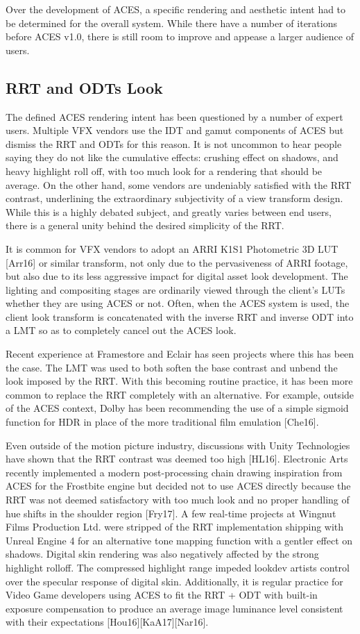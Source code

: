 \documentclass[conference]{IEEEtran}
\begin{document}
Over the development of ACES, a specific rendering and aesthetic intent had to be determined for the overall system. While there have a number of iterations before ACES v1.0, there is still room to improve and appease a larger audience of users.

\subsection{RRT and ODTs Look}
The defined ACES rendering intent has been questioned by a number of expert users. Multiple VFX vendors use the IDT and gamut components of ACES but dismiss the RRT and ODTs for this reason. It is not uncommon to hear people saying they do not like the cumulative effects: crushing effect on shadows, and heavy highlight roll off, with too much look for a rendering that should be average. On the other hand, some vendors are undeniably satisfied with the RRT contrast, underlining the extraordinary subjectivity of a view transform design. While this is a highly debated subject, and greatly varies between end users, there is a general unity behind the desired simplicity of the RRT.

It is common for VFX vendors to adopt an ARRI K1S1 Photometric 3D LUT [Arr16] or similar transform, not only due to the pervasiveness of ARRI footage, but also due to its less aggressive impact for digital asset look development. The lighting and compositing stages are ordinarily viewed through the client's LUTs whether they are using ACES or not. Often, when the ACES system is used, the client look transform is concatenated with the inverse RRT and inverse ODT into a LMT so as to completely cancel out the ACES look.

Recent experience at Framestore and Eclair has seen projects where this has been the case. The LMT was used to both soften the base contrast and unbend the look imposed by the RRT. With this becoming routine practice, it has been more common to replace the RRT completely with an alternative. For example, outside of the ACES context, Dolby has been recommending the use of a simple sigmoid function for HDR in place of the more traditional film emulation [Che16].

Even outside of the motion picture industry, discussions with Unity Technologies have shown that the RRT contrast was deemed too high [HL16]. Electronic Arts recently implemented a modern post-processing chain drawing inspiration from ACES for the Frostbite engine but decided not to use ACES directly because the RRT was not deemed satisfactory with too much look and no proper handling of hue shifts in the shoulder region [Fry17]. A few real-time projects at Wingnut Films Production Ltd. were stripped of the RRT implementation shipping with Unreal Engine 4 for an alternative tone mapping function with a gentler effect on shadows. Digital skin rendering was also negatively affected by the strong highlight rolloff. The compressed highlight range impeded lookdev artists control over the specular response of digital skin. Additionally, it is regular practice for Video Game developers using ACES to fit the RRT + ODT with built-in exposure compensation to produce an average image luminance level consistent with their expectations [Hou16][KaA17][Nar16].
\end{document}
